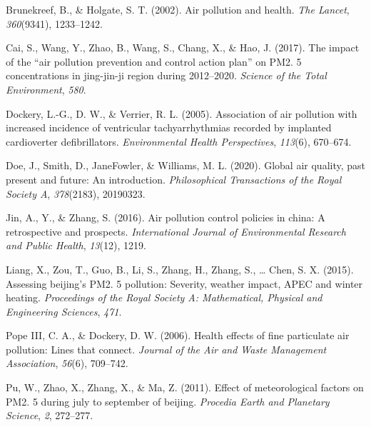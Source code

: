 \documentclass[
  12pt,
]{article}
\newlength{\cslhangindent}
\newlength{\cslentryspacingunit} %
\newenvironment{CSLReferences}[2] %
 {%
  \setlength{\parindent}{0pt}
  \ifodd #1
  \let\oldpar\par
  \def\par{\hangindent=\cslhangindent\oldpar}
  \fi
  \setlength{\parskip}{#2\cslentryspacingunit}
 }%
 {}
\begin{document}
\hypertarget{refs}{}
\begin{CSLReferences}{1}{0}
\leavevmode{}%
Brunekreef, B., \& Holgate, S. T. (2002). Air pollution and health.
\emph{The Lancet}, \emph{360}(9341), 1233--1242.

\leavevmode{}%
Cai, S., Wang, Y., Zhao, B., Wang, S., Chang, X., \& Hao, J. (2017). The
impact of the {``air pollution prevention and control action plan''} on
PM2. 5 concentrations in jing-jin-ji region during 2012--2020.
\emph{Science of the Total Environment}, \emph{580}.

\leavevmode{}%
Dockery, L.-G., D. W., \& Verrier, R. L. (2005). Association of air
pollution with increased incidence of ventricular tachyarrhythmias
recorded by implanted cardioverter defibrillators. \emph{Environmental
Health Perspectives}, \emph{113}(6), 670--674.

\leavevmode{}%
Doe, J., Smith, D., JaneFowler, \& Williams, M. L. (2020). Global air
quality, past present and future: An introduction. \emph{Philosophical
Transactions of the Royal Society A}, \emph{378}(2183), 20190323.

\leavevmode{}%
Jin, A., Y., \& Zhang, S. (2016). Air pollution control policies in
china: A retrospective and prospects. \emph{International Journal of
Environmental Research and Public Health}, \emph{13}(12), 1219.

\leavevmode{}%
Liang, X., Zou, T., Guo, B., Li, S., Zhang, H., Zhang, S., \ldots{}
Chen, S. X. (2015). Assessing beijing's PM2. 5 pollution: Severity,
weather impact, APEC and winter heating. \emph{Proceedings of the Royal
Society A: Mathematical, Physical and Engineering Sciences}, \emph{471}.

\leavevmode{}%
Pope III, C. A., \& Dockery, D. W. (2006). Health effects of fine
particulate air pollution: Lines that connect. \emph{Journal of the Air
and Waste Management Association}, \emph{56}(6), 709--742.

\leavevmode{}%
Pu, W., Zhao, X., Zhang, X., \& Ma, Z. (2011). Effect of meteorological
factors on PM2. 5 during july to september of beijing. \emph{Procedia
Earth and Planetary Science}, \emph{2}, 272--277.

\end{CSLReferences}
\end{document}
